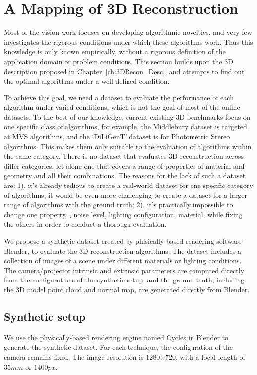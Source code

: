 
\chapter{A Mapping of 3D Reconstruction}
\label{ch:3DRecon_Mapping}
Most of the vision work focuses on developing algorithmic novelties, and very few investigates the rigorous conditions under which these algorithms work. Thus this knowledge is only known empirically, without a rigorous definition of the application domain or problem conditions. This section builds upon the 3D description proposed in Chapter~\ref{ch:3DRecon_Desc}, and attempts to find out the optimal algorithms under a well defined condition.

To achieve this goal, we need a dataset to evaluate the performance of each algorithm under varied conditions, which is not the goal of most of the online datasets. To the best of our knowledge, current existing 3D benchmarks focus on one specific class of algorithms, for example, the Middlebury dataset is targeted at MVS algorithms, and the `DiLiGenT' dataset is for Photometric Stereo algorithms. This makes them only suitable to the evaluation of algorithms within the same category. There is no dataset that evaluates 3D reconstruction across differ categories, let alone one that covers a range of properties of material and geometry and all their combinations. The reasons for the lack of such a dataset are: 1). it's already tedious to create a real-world dataset for one specific category of algorithms, it would be even more challenging to create a dataset for a larger range of algorithms with the ground truth; 2). it's practically impossible to change one property, \eg, noise level, lighting configuration, material, \etc while fixing the others in order to conduct a thorough evaluation.

We propose a synthetic dataset created by phisically-based rendering software - Blender, to evaluate the 3D reconstruction algorithms. The dataset includes a collection of images of a scene under different materials or lighting conditions. The camera/projector intrinsic and extrinsic parameters are computed directly from the configurations of the synthetic setup, and the ground truth, including the 3D model point cloud and normal map, are generated directly from Blender.

\section{Synthetic setup}
We use the physically-based rendering engine named Cycles in Blender to generate the synthetic dataset. For each technique, the configuration of the camera remains fixed. The image resolution is 1280$\times$720, with a focal length of $35mm$ or $1400px$.

